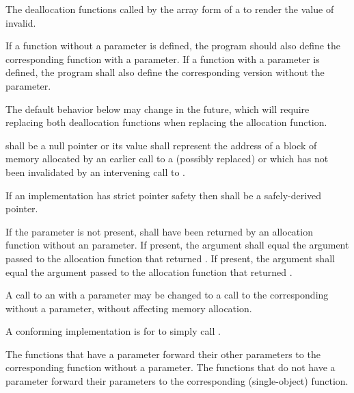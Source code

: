 \begin{itemdescr}
\pnum
\effects
The
deallocation functions
called by the array form of a
to render the value of  invalid.

\pnum
\replaceable
{}
If a function without a  parameter is defined,
the program should also define
the corresponding function with a  parameter.
If a function with a  parameter is defined,
the program shall also define
the corresponding version without the  parameter.
\begin{note}
The default behavior below may change in the future, which will require
replacing both deallocation functions when replacing the allocation function.
\end{note}

\pnum
\requires
{} shall be a null pointer or
its value shall represent the address of
a block of memory allocated by
an earlier call to a (possibly replaced)
or
which has not been invalidated by an intervening call to
.

\pnum
\requires
If an implementation has strict pointer safety
then  shall be a safely-derived pointer.

\pnum
\requires
If the  parameter is not present,
 shall have been returned by an allocation function
without an  parameter.
If present, the  argument
shall equal the  argument
passed to the allocation function that returned .
If present, the  argument
shall equal the  argument
passed to the allocation function that returned .

\pnum
\required
A call to an 
with a  parameter
may be changed to
a call to the corresponding 
without a  parameter,
without affecting memory allocation.
\begin{note} A conforming implementation is for
 to simply call
. \end{note}

\pnum
{}
The functions that have a  parameter
forward their other parameters
to the corresponding function without a  parameter.
The functions that do not have a  parameter
forward their parameters
to the corresponding  (single-object) function.
\end{itemdescr}

